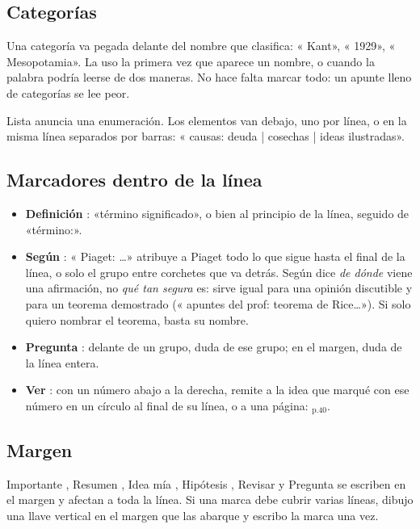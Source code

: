 \subsection{Categorías}
Una categoría va pegada delante del nombre que clasifica: « Kant»,
« 1929», « Mesopotamia». La uso la primera vez que aparece
un nombre, o cuando la palabra podría leerse de dos maneras. No hace falta
marcar todo: un apunte lleno de categorías se lee peor.

Lista  anuncia una enumeración. Los elementos van debajo, uno por
línea, o en la misma línea separados por barras:
« causas: deuda | cosechas | ideas ilustradas».

\subsection{Marcadores dentro de la línea}
\begin{itemize}
\item \textbf{Definición} : «término  significado», o bien
  al principio de la línea, seguido de «término:».
\item \textbf{Según} : « Piaget: \ldots» atribuye a Piaget todo
 lo que sigue hasta el final de la línea, o solo el grupo entre corchetes que
 va detrás. Según dice \emph{de dónde} viene una afirmación, no \emph{qué tan
 segura} es: sirve igual para una opinión discutible y para un teorema
 demostrado (« apuntes del prof: teorema de Rice\ldots»). Si solo
 quiero nombrar el teorema, basta su nombre.
\item \textbf{Pregunta} : delante de un grupo, duda de ese grupo; en el
 margen, duda de la línea entera.
\item \textbf{Ver} : con un número abajo a la derecha, remite a la idea
 que marqué con ese número en un círculo al final de su línea, o a una página:
 \(_{\text{p.40}}\).
\end{itemize}

\subsection{Margen}
Importante , Resumen , Idea mía , Hipótesis ,
Revisar  y Pregunta  se escriben en el margen y afectan a toda
la línea. Si una marca debe cubrir varias líneas, dibujo una llave vertical en el
margen que las abarque y escribo la marca una vez.

